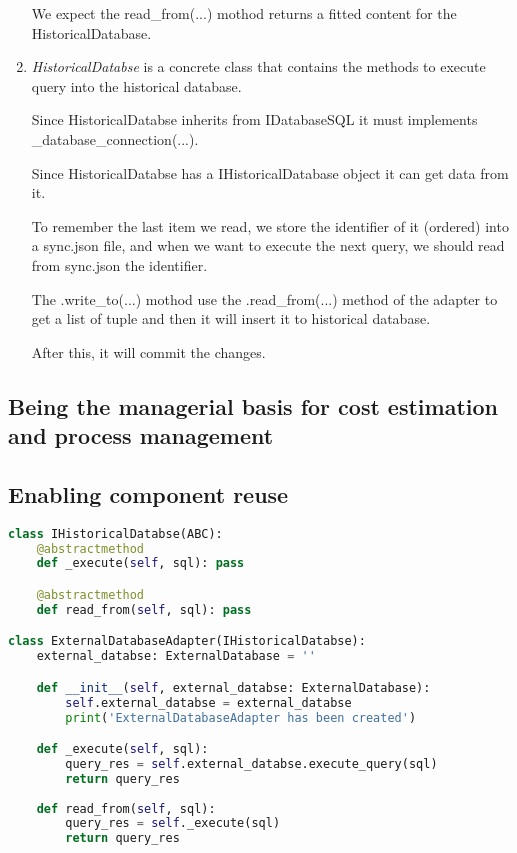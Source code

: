 \begin{enumerate}
     We expect the read\_from(...) mothod returns a fitted content for the HistoricalDatabase. 

	\item \textit{HistoricalDatabse} is a concrete class that contains the methods to execute query into the historical database.
	
     Since HistoricalDatabse inherits from IDatabaseSQL it must implements \_database\_connection(...).
    
     Since HistoricalDatabse has a IHistoricalDatabase object it can get data from it.
     
     To remember the last item we read, we store the identifier of it (ordered) into a sync.json file, and when we want to execute the next query, we should read from sync.json the identifier.
        
     The .write\_to(...) mothod use the .read\_from(...) method of the adapter to get a list of tuple and then it will insert it to historical database. 
     
     After this, it will commit the changes.
\end{enumerate}

\subsection{Being the managerial basis for cost estimation and process management}

\subsection{Enabling component reuse}

\begin{lstlisting}[language=Python]
class IHistoricalDatabse(ABC):
    @abstractmethod
    def _execute(self, sql): pass

    @abstractmethod
    def read_from(self, sql): pass

class ExternalDatabaseAdapter(IHistoricalDatabse):
    external_databse: ExternalDatabase = ''

    def __init__(self, external_databse: ExternalDatabase):
        self.external_databse = external_databse
        print('ExternalDatabaseAdapter has been created')

    def _execute(self, sql):
        query_res = self.external_databse.execute_query(sql)
        return query_res
    
    def read_from(self, sql):
        query_res = self._execute(sql) 
        return query_res   
\end{lstlisting}

